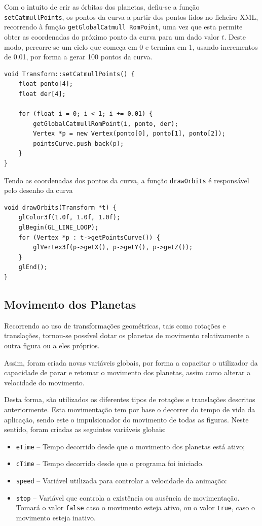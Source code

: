 \documentclass[a4paper, 11pt]{article}
\begin{document}
Com o intuito de crir as órbitas dos planetas, defiu-se a função \texttt{setCatmullPoints}, os 
pontos da curva a partir dos pontos lidos no ficheiro XML, recorrendo à função 
\texttt{getGlobalCatmull}\ \texttt{RomPoint}, uma vez que esta permite obter as coordenadas do 
próximo ponto da curva para um dado valor $t$. Deste modo, percorre-se um ciclo que começa em 0 e 
termina em 1, usando incrementos de 0.01, por forma a gerar 100 pontos da curva.

\begin{verbatim}
void Transform::setCatmullPoints() {
    float ponto[4];
    float der[4];

    for (float i = 0; i < 1; i += 0.01) {
        getGlobalCatmullRomPoint(i, ponto, der);
        Vertex *p = new Vertex(ponto[0], ponto[1], ponto[2]);
        pointsCurve.push_back(p);
    }
}
\end{verbatim}

Tendo as coordenadas dos pontos da curva, a função \texttt{drawOrbits} é responsável pelo 
desenho da curva

\begin{verbatim}
void drawOrbits(Transform *t) {
    glColor3f(1.0f, 1.0f, 1.0f);
    glBegin(GL_LINE_LOOP);
    for (Vertex *p : t->getPointsCurve()) {
        glVertex3f(p->getX(), p->getY(), p->getZ());
    }
    glEnd();
}
\end{verbatim}

\subsection{Movimento dos Planetas}

Recorrendo ao uso de transformações geométricas, tais como rotações e translações, tornou-se 
possível dotar os planetas de movimento relativamente a outra figura ou a eles próprios. 


Assim, foram criada novas variáveis globais, por forma a capacitar o utilizador da capacidade de 
parar e retomar o movimento dos planetas, assim como alterar a velocidade do movimento.

Desta forma, são utilizados os diferentes tipos de rotações e translações descritos 
anteriormente. Esta movimentação tem por base o decorrer do tempo de vida da aplicação, sendo 
este o impulsionador do movimento de todas as figuras. Neste sentido, foram criadas as seguintes 
variáveis globais:

\begin{itemize}
    \item \texttt{eTime} --  Tempo decorrido desde que o movimento dos planetas está ativo;
    \item \texttt{cTime} -- Tempo decorrido desde que o programa foi iniciado.
    \item \texttt{speed} -- Variável utilizada para controlar a velocidade da animação:
    \item \texttt{stop} -- Variável que controla a existência ou ausência de movimentação. 
Tomará o valor \texttt{false} caso o movimento esteja ativo, ou o valor \texttt{true}, caso o 
movimento
    esteja inativo.
\end{itemize}
\end{document}
